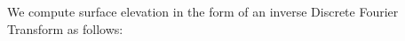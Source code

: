\begin{table}[h]
\caption{Left: Zero frequency at the center. Right: Zero frequency at upper left.}
\end{table}
%
We compute surface elevation in the form of an inverse Discrete Fourier Transform as follows:
